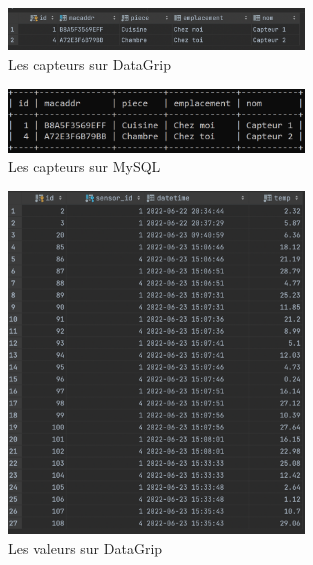 \documentclass[12pt, a4paper]{article}
\begin{document}
		\begin{figure}[H]
			\centering
			\includegraphics[width=0.7\textwidth]{../img/capteursgrip.png}
			\caption{Les capteurs sur DataGrip}
			\label{fig:cgrip}
		\end{figure}

		\begin{figure}[H]
			\centering
			\includegraphics[width=0.7\textwidth]{../img/capteursmysql.png}
			\caption{Les capteurs sur MySQL}
			\label{fig:csql}
		\end{figure}

		\begin{figure}[H]
			\centering
			\includegraphics[width=0.7\textwidth]{../img/datagrip.png}
			\caption{Les valeurs sur DataGrip}
			\label{fig:vgrip}
		\end{figure}
\end{document}
